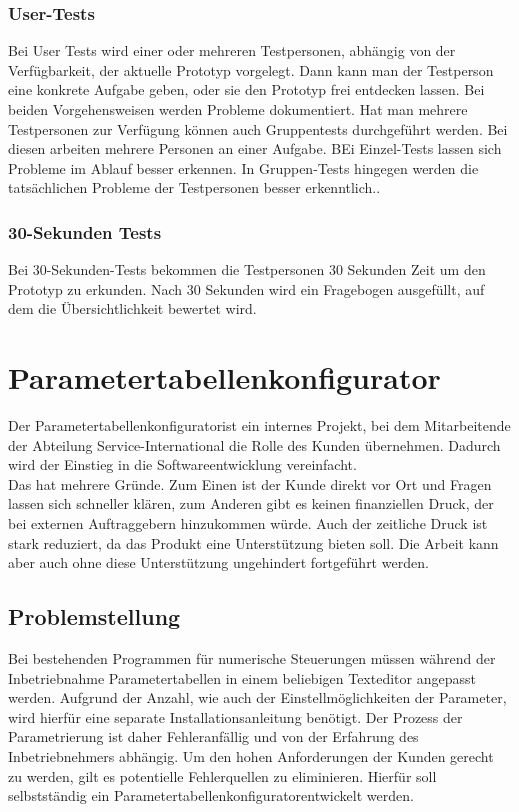 \documentclass[12pt,a4paper]{article}
\begin{document}
\subsubsection{User-Tests}
\label{User-Tests}
Bei User Tests wird einer oder mehreren Testpersonen, abhängig von der Verfügbarkeit, der aktuelle Prototyp vorgelegt. Dann kann man der Testperson eine konkrete Aufgabe geben, oder sie den Prototyp frei entdecken lassen. Bei beiden Vorgehensweisen werden Probleme dokumentiert. Hat man mehrere Testpersonen zur Verfügung können auch Gruppentests durchgeführt werden. Bei diesen arbeiten mehrere Personen an einer Aufgabe. BEi Einzel-Tests lassen sich Probleme im Ablauf besser erkennen. In Gruppen-Tests hingegen werden die tatsächlichen Probleme der Testpersonen besser erkenntlich.\cite{BASTIEN2010e18}.
\subsubsection{30-Sekunden Tests}
\label{30-Sekunden Tests}
Bei 30-Sekunden-Tests bekommen die Testpersonen 30 Sekunden Zeit um den Prototyp zu erkunden. Nach 30 Sekunden wird ein Fragebogen ausgefüllt, auf dem die Übersichtlichkeit bewertet wird\cite{vsimek2015usability}. 
\section{Parametertabellenkonfigurator}
Der \glqq Parametertabellenkonfigurator\grqq\space ist ein internes Projekt, bei dem Mitarbeitende der Abteilung Service-International die Rolle des Kunden übernehmen. Dadurch wird der Einstieg in die Softwareentwicklung vereinfacht. \\
Das hat mehrere Gründe. Zum Einen ist der Kunde direkt vor Ort und Fragen lassen sich schneller klären, zum Anderen gibt es keinen finanziellen Druck, der bei externen Auftraggebern hinzukommen würde. Auch der zeitliche Druck ist stark reduziert, da das Produkt eine Unterstützung bieten soll. Die Arbeit kann aber auch ohne diese Unterstützung ungehindert fortgeführt werden.
\subsection{Problemstellung}
Bei bestehenden Programmen für numerische Steuerungen müssen während der Inbetriebnahme Parametertabellen in einem beliebigen Texteditor angepasst werden. Aufgrund der Anzahl, wie auch der Einstellmöglichkeiten der Parameter, wird hierfür eine separate Installationsanleitung benötigt. Der Prozess der Parametrierung ist daher Fehleranfällig und von der Erfahrung des Inbetriebnehmers abhängig. Um den hohen Anforderungen der Kunden gerecht zu werden, gilt es potentielle Fehlerquellen zu eliminieren. Hierfür soll selbstständig ein \glqq Parametertabellenkonfigurator\grqq\space entwickelt werden.
\end{document}
